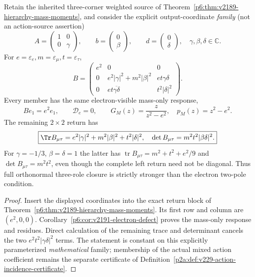 \documentclass[12pt,a4paper]{article}
\begin{document}
\begin{corollary}
\label{p6:cor:v239-protected-electron-corner-family}
Retain the inherited three-corner weighted source of
Theorem~\ref{p6:thm:v2189-hierarchy-mass-moments}, and consider the
explicit output-coordinate \emph{family} (not an action-source assertion)
\[
 A=\begin{pmatrix}1&0\\0&\gamma\end{pmatrix},\qquad
 b=\begin{pmatrix}0\\\beta\end{pmatrix},\qquad
 d=\begin{pmatrix}0\\\delta\end{pmatrix},
 \quad \gamma,\beta,\delta\in\mathbb C.
\]
For $e=\varepsilon_e,m=\varepsilon_\mu,t=\varepsilon_\tau$,
\[
 B=\begin{pmatrix}
 e^2&0&0\\
 0&e^2|\gamma|^2+m^2|\beta|^2&et\gamma\delta\\
 0&et\overline{\gamma\delta}&t^2|\delta|^2
 \end{pmatrix}.
\]
Every member has the same electron-visible mass-only response,
\begin{equation}\label{p6:eq:v239-electron-protected-family}
 \boxed{Be_1=e^2e_1,\qquad\mathcal D_e=0,\qquad
 G_M(z)=\frac{z}{z^2-e^2},\quad p_M(z)=z^2-e^2.}
\end{equation}
The remaining $2\times2$ return has
\[
 \boxed{\Tr B_{\mu\tau}=e^2|\gamma|^2+m^2|\beta|^2
  +t^2|\delta|^2,\quad
 \det B_{\mu\tau}=m^2t^2|\beta\delta|^2.}
\]
For $\gamma=-1/3$, $\beta=\delta=1$ the latter has
$\operatorname{tr}B_{\mu\tau}=m^2+t^2+e^2/9$ and
$\det B_{\mu\tau}=m^2t^2$, even though the complete left return need
not be diagonal. Thus full orthonormal three-role closure is strictly
stronger than the electron two-pole condition.
\end{corollary}
\begin{proof}
Insert the displayed coordinates into the exact return block of
Theorem~\ref{p6:thm:v2189-hierarchy-mass-moments}. Its first row
and column are $(e^2,0,0)$. Corollary~\ref{p6:cor:v2191-electron-defect}
proves the mass-only response and residues. Direct calculation of the
remaining trace and determinant cancels the two $e^2t^2|\gamma\delta|^2$
terms. The statement is constant on this explicitly parameterized
\emph{mathematical} family; membership of the actual mixed action
coefficient remains the separate certificate of
Definition~\ref{p2a:def:v229-action-incidence-certificate}.
\end{proof}
\end{document}
